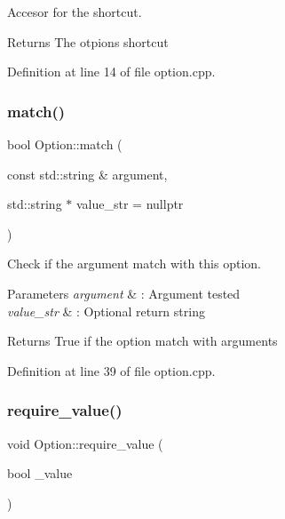 Accesor for the shortcut. 

\begin{DoxyReturn}{Returns}
The otpion\textquotesingle{}s shortcut 
\end{DoxyReturn}


Definition at line 14 of file option.\+cpp.

\hypertarget{class_option_a261ccd60f0317b0e7a37ebd25e79bc9a}{}\label{class_option_a261ccd60f0317b0e7a37ebd25e79bc9a} 
\subsubsection{\texorpdfstring{match()}{match()}}
{\footnotesize\ttfamily bool Option\+::match (\begin{DoxyParamCaption}\item[{const std\+::string \&}]{argument,  }\item[{std\+::string $\ast$}]{value\+\_\+str = {\ttfamily nullptr} }\end{DoxyParamCaption})}



Check if the argument match with this option. 


\begin{DoxyParams}{Parameters}
{\em argument} & \+: Argument tested \\
\hline
{\em value\+\_\+str} & \+: Optional return string\\
\hline
\end{DoxyParams}
\begin{DoxyReturn}{Returns}
True if the option match with arguments 
\end{DoxyReturn}


Definition at line 39 of file option.\+cpp.

\hypertarget{class_option_ab9ebb3871e3998d2d6ae7014606ad85e}{}\label{class_option_ab9ebb3871e3998d2d6ae7014606ad85e} 
\subsubsection{\texorpdfstring{require\+\_\+value()}{require\_value()}}
{\footnotesize\ttfamily void Option\+::require\+\_\+value (\begin{DoxyParamCaption}\item[{bool}]{\+\_\+value }\end{DoxyParamCaption})}



